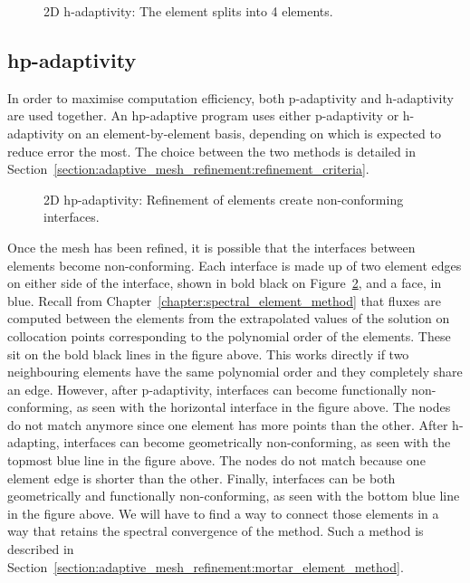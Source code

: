 \begin{figure}[H]
	\centering
	
	\caption{2D h-adaptivity: The element splits into 4 elements.}\label{fig:h-adaptivity}
\end{figure}

\subsection{hp-adaptivity}\label{subsection:adaptive_mesh_refinement:adaptivity_strategies:hp-adaptivity}

In order to maximise computation efficiency, both p-adaptivity and h-adaptivity are used together.
An hp-adaptive program uses either p-adaptivity or h-adaptivity on an element-by-element basis,
depending on which is expected to reduce error the most. The choice between the two methods is
detailed in Section~\ref{section:adaptive_mesh_refinement:refinement_criteria}.

\begin{figure}[H]
	\centering
	
	\caption{2D hp-adaptivity: Refinement of elements create non-conforming interfaces.}\label{fig:hp-adaptivity}
\end{figure}

Once the mesh has been refined, it is possible that the interfaces between elements become
non-conforming. Each interface is made up of two element edges on either side of the interface,
shown in bold black on Figure~\ref{fig:hp-adaptivity}, and a face, in blue. Recall from
Chapter~\ref{chapter:spectral_element_method} that fluxes are computed between the elements from the
extrapolated values of the solution on collocation points corresponding to the polynomial order of
the elements. These sit on the bold black lines in the figure above. This works directly if two
neighbouring elements have the same polynomial order and they completely share an edge. However,
after p-adaptivity, interfaces can become functionally non-conforming, as seen with the horizontal
interface in the figure above. The nodes do not match anymore since one element has more points than
the other. After h-adapting, interfaces can become geometrically non-conforming, as seen with the
topmost blue line in the figure above. The nodes do not match because one element edge is shorter
than the other. Finally, interfaces can be both geometrically and functionally non-conforming, as
seen with the bottom blue line in the figure above. We will have to find a way to connect those
elements in a way that retains the spectral convergence of the method. Such a method is described in
Section~\ref{section:adaptive_mesh_refinement:mortar_element_method}.

